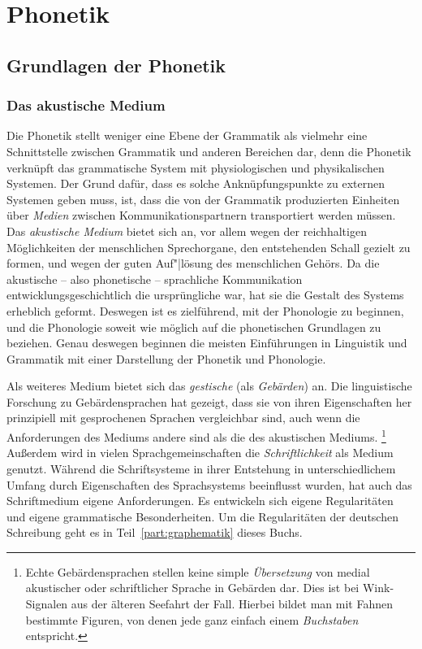 \chapter{Phonetik}
\label{sec:phonetik}

\section{Grundlagen der Phonetik}
\label{sec:grundlagenderphonetik}

\subsection{Das akustische Medium}
\label{sec:dasakustischemedium}


Die Phonetik stellt weniger eine Ebene der Grammatik als vielmehr eine Schnittstelle zwischen Grammatik und anderen Bereichen dar, denn die Phonetik verknüpft das grammatische System mit physiologischen und physikalischen Systemen.
Der Grund dafür, dass es solche Anknüpfungspunkte zu externen Systemen geben muss, ist, dass die von der Grammatik produzierten Einheiten über \textit{Medien} zwischen Kommunikationspartnern transportiert werden müssen.
Das \textit{akustische Medium} bietet sich an, vor allem wegen der reichhaltigen Möglichkeiten der menschlichen Sprechorgane, den entstehenden Schall gezielt zu formen, und wegen der guten Auf"|lösung des menschlichen Gehörs.
Da die akustische -- also phonetische -- sprachliche Kommunikation entwicklungsgeschichtlich die ursprüngliche war, hat sie die Gestalt des Systems erheblich geformt.
Deswegen ist es zielführend, mit der Phonologie zu beginnen, und die Phonologie soweit wie möglich auf die phonetischen Grundlagen zu beziehen.
Genau deswegen beginnen die meisten Einführungen in Linguistik und Grammatik mit einer Darstellung der Phonetik und Phonologie.

Als weiteres Medium bietet sich das \textit{gestische} (als \textit{Gebärden}) an.
Die linguistische Forschung zu Gebärdensprachen hat gezeigt, dass sie von ihren Eigenschaften her prinzipiell mit gesprochenen Sprachen vergleichbar sind, auch wenn die Anforderungen des Mediums andere sind als die des akustischen Mediums.%
\footnote{Echte Gebärdensprachen stellen keine simple \textit{Übersetzung} von medial akustischer oder schriftlicher Sprache in Gebärden dar.
Dies ist \zB bei Wink-Signalen aus der älteren Seefahrt der Fall.
Hierbei bildet man mit Fahnen bestimmte Figuren, von denen jede ganz einfach einem \textit{Buchstaben} entspricht.}
Außerdem wird in vielen Sprachgemeinschaften die \textit{Schriftlichkeit} als Medium genutzt.
Während die Schriftsysteme in ihrer Entstehung in unterschiedlichem Umfang durch Eigenschaften des Sprachsystems beeinflusst wurden, hat auch das Schriftmedium eigene Anforderungen.
Es entwickeln sich eigene Regularitäten und eigene grammatische Besonderheiten.
Um die Regularitäten der deutschen Schreibung geht es in Teil~\ref{part:graphematik} dieses Buchs.

